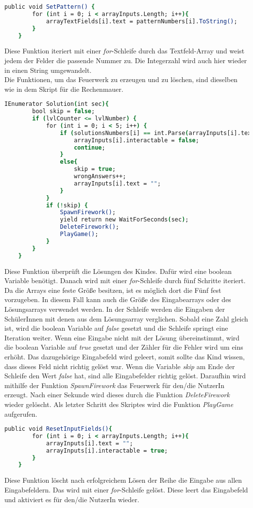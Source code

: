 \begin{lstlisting}[language=csh, caption={hideCircle.cs SetPattern-Funktion}]
	public void SetPattern() {
		for (int i = 0; i < arrayInputs.Length; i++){
			arrayTextFields[i].text = patternNumbers[i].ToString();
		}
	}
\end{lstlisting}
Diese Funktion iteriert mit einer \textit{for}-Schleife durch das Textfeld-Array und weist jedem der Felder die passende Nummer zu. Die Integerzahl wird auch hier wieder in einen String umgewandelt.\\
Die Funktionen, um das Feuerwerk zu erzeugen und zu löschen, sind dieselben wie in dem Skript für die Rechenmauer.\\ %
\begin{lstlisting}[language=csh, caption={hideCircle.cs Solution-Funktion}]
	IEnumerator Solution(int sec){
		bool skip = false;
		if (lvlCounter <= lvlNumber) {
			for (int i = 0; i < 5; i++) {
				if (solutionsNumbers[i] == int.Parse(arrayInputs[i].text)) {
					arrayInputs[i].interactable = false;
					continue;
				}
				else{
					skip = true;
					wrongAnswers++;
					arrayInputs[i].text = "";
				}
			}
			if (!skip) {
				SpawnFirework();
				yield return new WaitForSeconds(sec);
				DeleteFirework();
				PlayGame();
			}
		}
	}
\end{lstlisting}
Diese Funktion überprüft die Lösungen des Kindes. Dafür wird eine boolean Variable benötigt. Danach wird mit einer \textit{for}-Schleife durch fünf Schritte iteriert. Da die Arrays eine feste Größe besitzen, ist es möglich dort die Fünf fest vorzugeben. In diesem Fall kann auch die Größe des Eingabearrays oder des Lösungsarrays verwendet werden. In der Schleife werden die Eingaben der SchülerInnen mit denen aus dem Lösungsarray verglichen. Sobald eine Zahl gleich ist, wird die boolean Variable auf \textit{false} gesetzt und die Schleife springt eine Iteration weiter. Wenn eine Eingabe nicht mit der Lösung übereinstimmt, wird die boolean Variable auf \textit{true} gesetzt und der Zähler für die Fehler wird um eins erhöht. Das dazugehörige Eingabefeld wird geleert, somit sollte das Kind wissen, dass dieses Feld nicht richtig gelöst war. Wenn die Variable \textit{skip} am Ende der Schleife den Wert \textit{false} hat, sind alle Eingabefelder richtig gelöst. Daraufhin wird mithilfe der Funktion \textit{SpawnFirework} das Feuerwerk für den/die NutzerIn erzeugt. Nach einer Sekunde wird dieses durch die Funktion \textit{DeleteFirework} wieder gelöscht. Als letzter Schritt des Skriptes wird die Funktion \textit{PlayGame} aufgerufen. \\
\begin{lstlisting}[language=csh, caption={hideCircle.cs ResetInputFields-Funktion}]
	public void ResetInputFields(){
		for (int i = 0; i < arrayInputs.Length; i++){
			arrayInputs[i].text = "";
			arrayInputs[i].interactable = true;
		}
	}
\end{lstlisting}
Diese Funktion löscht nach erfolgreichem Lösen der Reihe die Eingabe aus allen Eingabefeldern. Das wird mit einer \textit{for}-Schleife gelöst. Diese leert das Eingabefeld und aktiviert es für den/die NutzerIn wieder.
